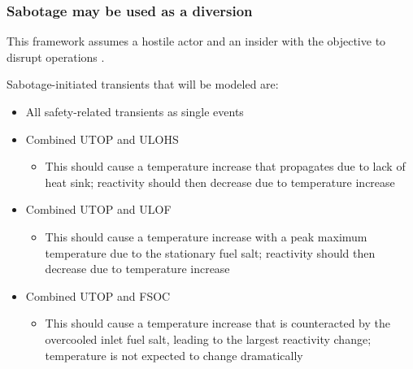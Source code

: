 \begin{frame}
  \frametitle{Sabotage may be used as a diversion}
  This framework assumes a hostile actor and an insider with the objective to disrupt operations \cite{protection2011evaluation}.
    \begin{block}{Sabotage-initiated transients that will be modeled are:}
        \begin{itemize}
            \item All safety-related transients as single events
            \item Combined \Gls{UTOP} and \gls{ULOHS}
            \begin{itemize}
                \item This should cause a temperature increase that propagates due to lack of heat sink; reactivity should then decrease due to temperature increase
            \end{itemize}
            \item Combined \Gls{UTOP} and \gls{ULOF}
            \begin{itemize}
                \item This should cause a temperature increase with a peak maximum temperature due to the stationary fuel salt; reactivity should then decrease due to temperature increase
            \end{itemize}
            \item Combined \Gls{UTOP} and \gls{FSOC}
            \begin{itemize}
                \item This should cause a temperature increase that is counteracted by the overcooled inlet fuel salt, leading to the largest reactivity change; temperature is not expected to change dramatically
            \end{itemize}
        \end{itemize}
    \end{block}
\end{frame}

